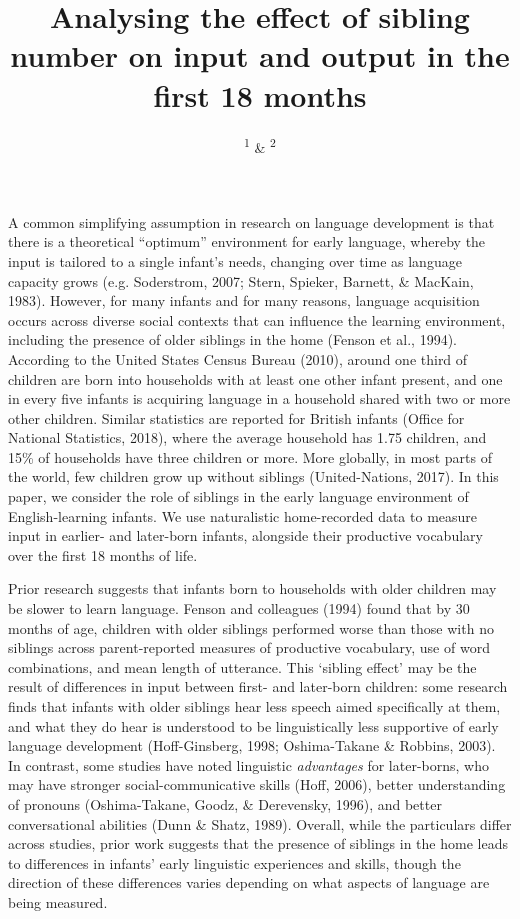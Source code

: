 \documentclass[
  man,mask,floatsintext]{apa6}
\title{Analysing the effect of sibling number on input and output in the first 18 months}
\author{\textsuperscript{1} \& \textsuperscript{2}}
\date{}
\affiliation{\vspace{0.5cm}\textsuperscript{1} \\\textsuperscript{2} }
\begin{document}
\maketitle

A common simplifying assumption in research on language development is that there is a theoretical ``optimum'' environment for early language, whereby the input is tailored to a single infant's needs, changing over time as language capacity grows (e.g. Soderstrom, 2007; Stern, Spieker, Barnett, \& MacKain, 1983). However, for many infants and for many reasons, language acquisition occurs across diverse social contexts that can influence the learning environment, including the presence of older siblings in the home (Fenson et al., 1994). According to the United States Census Bureau (2010), around one third of children are born into households with at least one other infant present, and one in every five infants is acquiring language in a household shared with two or more other children. Similar statistics are reported for British infants (Office for National Statistics, 2018), where the average household has 1.75 children, and 15\% of households have three children or more. More globally, in most parts of the world, few children grow up without siblings (United-Nations, 2017). In this paper, we consider the role of siblings in the early language environment of English-learning infants. We use naturalistic home-recorded data to measure input in earlier- and later-born infants, alongside their productive vocabulary over the first 18 months of life.

Prior research suggests that infants born to households with older children may be slower to learn language. Fenson and colleagues (1994) found that by 30 months of age, children with older siblings performed worse than those with no siblings across parent-reported measures of productive vocabulary, use of word combinations, and mean length of utterance. This `sibling effect' may be the result of differences in input between first- and later-born children: some research finds that infants with older siblings hear less speech aimed specifically at them, and what they do hear is understood to be linguistically less supportive of early language development (Hoff-Ginsberg, 1998; Oshima-Takane \& Robbins, 2003). In contrast, some studies have noted linguistic \emph{advantages} for later-borns, who may have stronger social-communicative skills (Hoff, 2006), better understanding of pronouns (Oshima-Takane, Goodz, \& Derevensky, 1996), and better conversational abilities (Dunn \& Shatz, 1989). Overall, while the particulars differ across studies, prior work suggests that the presence of siblings in the home leads to differences in infants' early linguistic experiences and skills, though the direction of these differences varies depending on what aspects of language are being measured.
\end{document}
